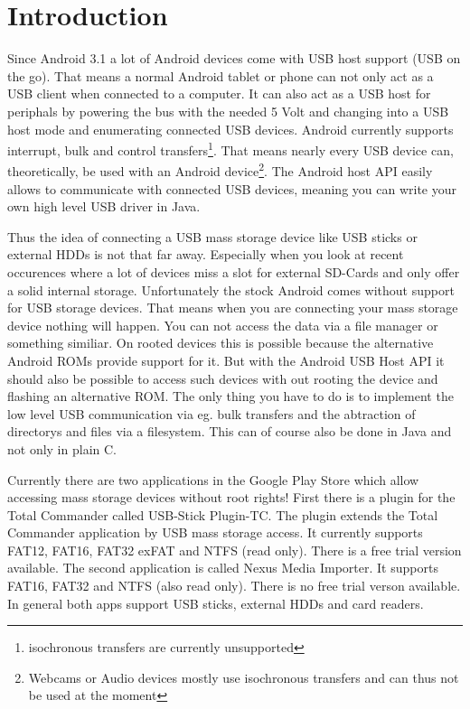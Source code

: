 \chapter{Introduction}
\label{chapter:Introduction}



Since Android 3.1 a lot of Android devices come with USB host support (USB on the go). That means a normal Android tablet or phone can not only act as a USB client when connected to a computer. It can also act as a USB host for periphals by powering the bus with the needed 5 Volt and changing into a USB host mode and enumerating connected USB devices\cite{android_usb_host}. Android currently supports interrupt, bulk and control transfers\footnote{isochronous transfers are currently unsupported\cite{android_usb_constants}}. That means nearly every USB device can, theoretically, be used with an Android device\footnote{Webcams or Audio devices mostly use isochronous transfers and can thus not be used at the moment}. The Android host API easily allows to communicate with connected USB devices, meaning you can write your own high level USB driver in Java.

Thus the idea of connecting a USB mass storage device like USB sticks or external HDDs is not that far away. Especially when you look at recent occurences where a lot of devices miss a slot for external SD-Cards and only offer a solid internal storage. Unfortunately the stock Android comes without support for USB storage devices. That means when you are connecting your mass storage device nothing will happen. You can not access the data via a file manager or something similiar. On rooted devices this is possible because the alternative Android ROMs provide support for it. But with the Android USB Host API it should also be possible to access such devices with out rooting the device and flashing an alternative ROM. The only thing you have to do is to implement the low level USB communication via eg. bulk transfers and the abtraction of directorys and files via a filesystem. This can of course also be done in Java and not only in plain C.

Currently there are two applications in the Google Play Store which allow accessing mass storage devices without root rights! First there is a plugin for the Total Commander called USB-Stick Plugin-TC. The plugin extends the Total Commander application by USB mass storage access. It currently supports FAT12, FAT16, FAT32 exFAT and NTFS (read only). There is a free trial version available. The second application is called Nexus Media Importer. It supports FAT16, FAT32 and NTFS (also read only). There is no free trial verson available. In general both apps support USB sticks, external HDDs and card readers.

